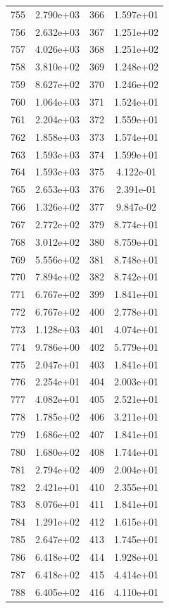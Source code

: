 \documentclass[12pt]{article}
\begin{document}
\begin{longtable}{@{}cccc@{}}
755 & 2.790e+03 & 366 & 1.597e+01 \\
756 & 2.632e+03 & 367 & 1.251e+02 \\
757 & 4.026e+03 & 368 & 1.251e+02 \\
758 & 3.810e+02 & 369 & 1.248e+02 \\
759 & 8.627e+02 & 370 & 1.246e+02 \\
760 & 1.064e+03 & 371 & 1.524e+01 \\
761 & 2.204e+03 & 372 & 1.559e+01 \\
762 & 1.858e+03 & 373 & 1.574e+01 \\
763 & 1.593e+03 & 374 & 1.599e+01 \\
764 & 1.593e+03 & 375 & 4.122e-01 \\
765 & 2.653e+03 & 376 & 2.391e-01 \\
766 & 1.326e+02 & 377 & 9.847e-02 \\
767 & 2.772e+02 & 379 & 8.774e+01 \\
768 & 3.012e+02 & 380 & 8.759e+01 \\
769 & 5.556e+02 & 381 & 8.748e+01 \\
770 & 7.894e+02 & 382 & 8.742e+01 \\
771 & 6.767e+02 & 399 & 1.841e+01 \\
772 & 6.767e+02 & 400 & 2.778e+01 \\
773 & 1.128e+03 & 401 & 4.074e+01 \\
774 & 9.786e+00 & 402 & 5.779e+01 \\
775 & 2.047e+01 & 403 & 1.841e+01 \\
776 & 2.254e+01 & 404 & 2.003e+01 \\
777 & 4.082e+01 & 405 & 2.521e+01 \\
778 & 1.785e+02 & 406 & 3.211e+01 \\
779 & 1.686e+02 & 407 & 1.841e+01 \\
780 & 1.680e+02 & 408 & 1.744e+01 \\
781 & 2.794e+02 & 409 & 2.004e+01 \\
782 & 2.421e+01 & 410 & 2.355e+01 \\
783 & 8.076e+01 & 411 & 1.841e+01 \\
784 & 1.291e+02 & 412 & 1.615e+01 \\
785 & 2.647e+02 & 413 & 1.745e+01 \\
786 & 6.418e+02 & 414 & 1.928e+01 \\
787 & 6.418e+02 & 415 & 4.414e+01 \\
788 & 6.405e+02 & 416 & 4.110e+01 \\

\end{longtable}
\end{document}
